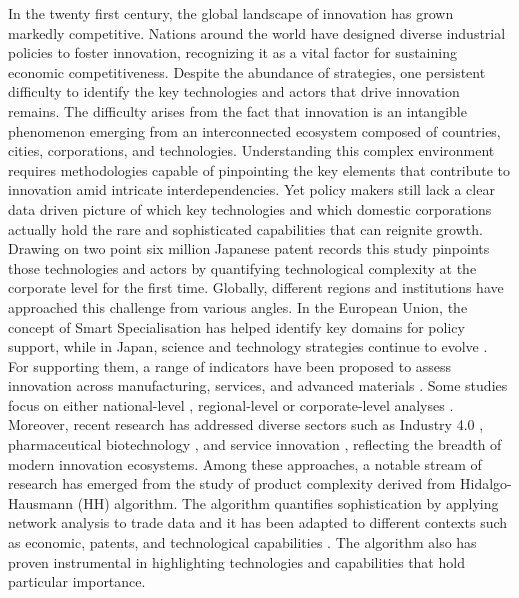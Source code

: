 \documentclass[fleqn,10pt]{wlscirep}
\begin{document}
In the twenty first century, the global landscape of innovation has grown markedly competitive. 
Nations around the world have designed diverse industrial policies to foster innovation, recognizing it as a vital factor for sustaining economic competitiveness. 
Despite the abundance of strategies, one persistent difficulty to identify the key technologies and actors that drive innovation remains. 
The difficulty arises from the fact that innovation is an intangible phenomenon emerging from an interconnected ecosystem composed of countries, cities, corporations, and technologies. 
Understanding this complex environment requires methodologies capable of pinpointing the key elements that contribute to innovation amid intricate interdependencies.
Yet policy makers still lack a clear data driven picture of which key technologies and which domestic corporations actually hold the rare and sophisticated capabilities that can reignite growth. Drawing on two point six million Japanese patent records this study pinpoints those technologies and actors by quantifying technological complexity at the corporate level for the first time.
Globally, different regions and institutions have approached this challenge from various angles. 
In the European Union, the concept of Smart Specialisation \cite{EC_SSP_nodate,Teixeira2022} has helped identify key domains for policy support, while in Japan, science and technology strategies continue to evolve \cite{NISTEP_nodate}. For supporting them, a range of indicators have been proposed to assess innovation across manufacturing, services, and advanced materials \cite{Taques2021,Farcal2023}. 
Some studies focus on either national-level \cite{Teixeira2022,Abay2024}, regional-level \cite{Balland2018,PintarScherngell2022,Pinheiro2022,Whittle2019} or corporate-level analyses \cite{Bruno2018,Buccellato2016,Kito2018}. 
Moreover, recent research has addressed diverse sectors such as Industry 4.0 \cite{Teixeira2022}, pharmaceutical biotechnology \cite{Sakakibara2014,Nakamura2022,Bhatia2018,Murakami2024}, and service innovation \cite{Taques2021}, reflecting the breadth of modern innovation ecosystems.
Among these approaches, a notable stream of research has emerged from the study of product complexity derived from Hidalgo-Hausmann (HH) algorithm\cite{Hidalgo2009}. 
The algorithm quantifies sophistication by applying network analysis to trade data and it has been adapted to different contexts such as economic, patents, and technological capabilities \cite{Hidalgo2021,Hidalgo2023,Hausmann2024,Balland2022,Chakraborty2020}. 
The algorithm also has proven instrumental in highlighting technologies and capabilities that hold particular importance. 
\end{document}
